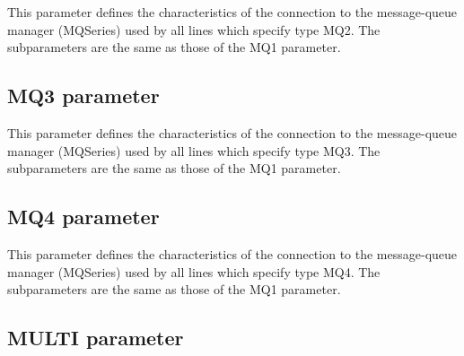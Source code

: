 \documentclass[letterpaper,10pt,english]{sphinxmanual}
\begin{document}
This parameter defines the characteristics of the connection to the message-queue manager (MQSeries) used by all lines which specify type MQ2. The subparameters are the same as those of the MQ1 parameter.


\subsection{MQ3 parameter}
\label{\detokenize{Installation_Guide:mq3-parameter}}
\begin{sphinxVerbatim}[commandchars=\\\{\}]
\PYG{p}{[}\PYG{p}{]}             
\end{sphinxVerbatim}

This parameter defines the characteristics of the connection to the message-queue manager (MQSeries) used by all lines which specify type MQ3. The subparameters are the same as those of the MQ1 parameter.


\subsection{MQ4 parameter}
\label{\detokenize{Installation_Guide:mq4-parameter}}
\begin{sphinxVerbatim}[commandchars=\\\{\}]
\PYG{p}{[}\PYG{p}{]}    
\end{sphinxVerbatim}

This parameter defines the characteristics of the connection to the message-queue manager (MQSeries) used by all lines which specify type MQ4. The subparameters are the same as those of the MQ1 parameter.


\subsection{MULTI parameter}
\label{\detokenize{Installation_Guide:multi-parameter}}\label{\detokenize{Installation_Guide:index-91}}
\begin{sphinxVerbatim}[commandchars=\\\{\}]
 
\end{sphinxVerbatim}
\end{document}
